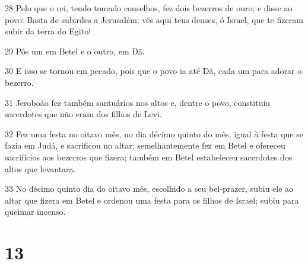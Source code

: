 \par 28 Pelo que o rei, tendo tomado conselhos, fez dois bezerros de ouro; e disse ao povo: Basta de subirdes a Jerusalém; vês aqui teus deuses, ó Israel, que te fizeram subir da terra do Egito!
\par 29 Pôs um em Betel e o outro, em Dã.
\par 30 E isso se tornou em pecado, pois que o povo ia até Dã, cada um para adorar o bezerro.
\par 31 Jeroboão fez também santuários nos altos e, dentre o povo, constituiu sacerdotes que não eram dos filhos de Levi.
\par 32 Fez uma festa no oitavo mês, no dia décimo quinto do mês, igual à festa que se fazia em Judá, e sacrificou no altar; semelhantemente fez em Betel e ofereceu sacrifícios aos bezerros que fizera; também em Betel estabeleceu sacerdotes dos altos que levantara.
\par 33 No décimo quinto dia do oitavo mês, escolhido a seu bel-prazer, subiu ele ao altar que fizera em Betel e ordenou uma festa para os filhos de Israel; subiu para queimar incenso.

\chapter{13}

